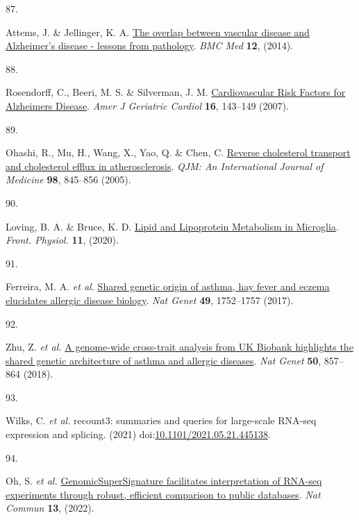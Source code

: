 \documentclass[
  a4paper,
]{article}
\newlength{\cslhangindent}
\newlength{\csllabelwidth}
\newlength{\cslentryspacingunit} %
\newenvironment{CSLReferences}[2] %
 {%
  \setlength{\parindent}{0pt}
  \ifodd #1
  \let\oldpar\par
  \def\par{\hangindent=\cslhangindent\oldpar}
  \fi
  \setlength{\parskip}{#2\cslentryspacingunit}
 }%
 {}
\newcommand{\CSLLeftMargin}[1]{\parbox[t]{\csllabelwidth}{#1}}
\newcommand{\CSLRightInline}[1]{\parbox[t]{\linewidth - \csllabelwidth}{#1}\break}
\begin{document}
\begin{CSLReferences}{0}{0}
\leavevmode{}%
\CSLLeftMargin{87. }%
\CSLRightInline{Attems, J. \& Jellinger, K. A. \href{https://doi.org/10.1186/s12916-014-0206-2}{The overlap between vascular disease and Alzheimer's disease - lessons from pathology}. \emph{BMC Med} \textbf{12}, (2014).}

\leavevmode{}%
\CSLLeftMargin{88. }%
\CSLRightInline{Rosendorff, C., Beeri, M. S. \& Silverman, J. M. \href{https://doi.org/10.1111/j.1076-7460.2007.06696.x}{Cardiovascular Risk Factors for Alzheimer\textquotesingle s Disease}. \emph{Amer J Geriatric Cardiol} \textbf{16}, 143--149 (2007).}

\leavevmode{}%
\CSLLeftMargin{89. }%
\CSLRightInline{Ohashi, R., Mu, H., Wang, X., Yao, Q. \& Chen, C. \href{https://doi.org/10.1093/qjmed/hci136}{Reverse cholesterol transport and cholesterol efflux in atherosclerosis}. \emph{QJM: An International Journal of Medicine} \textbf{98}, 845--856 (2005).}

\leavevmode{}%
\CSLLeftMargin{90. }%
\CSLRightInline{Loving, B. A. \& Bruce, K. D. \href{https://doi.org/10.3389/fphys.2020.00393}{Lipid and Lipoprotein Metabolism in Microglia}. \emph{Front. Physiol.} \textbf{11}, (2020).}

\leavevmode{}%
\CSLLeftMargin{91. }%
\CSLRightInline{Ferreira, M. A. \emph{et al.} \href{https://doi.org/10.1038/ng.3985}{Shared genetic origin of asthma, hay fever and eczema elucidates allergic disease biology}. \emph{Nat Genet} \textbf{49}, 1752--1757 (2017).}

\leavevmode{}%
\CSLLeftMargin{92. }%
\CSLRightInline{Zhu, Z. \emph{et al.} \href{https://doi.org/10.1038/s41588-018-0121-0}{A genome-wide cross-trait analysis from UK Biobank highlights the shared genetic architecture of asthma and allergic diseases}. \emph{Nat Genet} \textbf{50}, 857--864 (2018).}

\leavevmode{}%
\CSLLeftMargin{93. }%
\CSLRightInline{Wilks, C. \emph{et al.} recount3: summaries and queries for large-scale RNA-seq expression and splicing. (2021) doi:\href{https://doi.org/10.1101/2021.05.21.445138}{10.1101/2021.05.21.445138}.}

\leavevmode{}%
\CSLLeftMargin{94. }%
\CSLRightInline{Oh, S. \emph{et al.} \href{https://doi.org/10.1038/s41467-022-31411-3}{GenomicSuperSignature facilitates interpretation of RNA-seq experiments through robust, efficient comparison to public databases}. \emph{Nat Commun} \textbf{13}, (2022).}


\end{CSLReferences}
\end{document}
